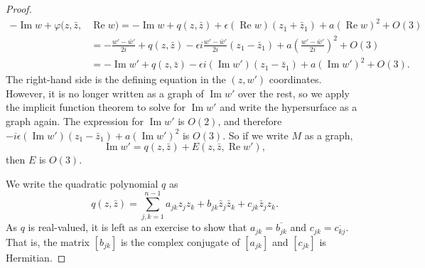 \documentclass[12pt,openany]{book}
\renewcommand{\Re}{\operatorname{Re}}
\renewcommand{\Im}{\operatorname{Im}}
\theoremstyle{plain}
\theoremstyle{remark}
\theoremstyle{definition}
\theoremstyle{exercise}
\theoremstyle{example}
\begin{document}
\begin{proof}
\begin{equation*}
\begin{split}
-\Im w + \varphi(z,\bar{z}, & \Re w)  =
-\Im w +
q(z,\bar{z}) +
\epsilon (\Re w) (z_1+\bar{z}_1)
+ a{(\Re w)}^2
+O(3)
\\
& =
-\frac{w'-\bar{w}'}{2i} 
+
q(z,\bar{z}) 
- \epsilon i
\frac{w' -\bar{w}'}{2i}
( z_1 -\bar{z}_1)
+ a {\left(\frac{w'-\bar{w}'}{2i}\right)}^2
+O(3)
\\
& =
-\Im w'
+ q(z,\bar{z})
-
\epsilon i
(\Im w')
( z_1 -\bar{z}_1)
+
a {(\Im w')}^2
+O(3) .
\end{split}
\end{equation*}
The right-hand side is the defining equation in the $(z,w')$ coordinates.
However, it is no longer written as a graph of $\Im w'$ over the
rest, so we apply the implicit
function theorem to solve for $\Im w'$
and write the hypersurface as a graph again.
The expression for $\Im w'$
is $O(2)$, and therefore $-i\epsilon (\Im w')(z_1-\bar{z}_1)+a{(\Im w')}^2$
is $O(3)$.
So if we write $M$ as a graph,
\begin{equation*}
\Im w' = q(z,\bar{z}) + E(z,\bar{z},\Re w'),
\end{equation*}
then $E$ is $O(3)$.

We write the quadratic polynomial $q$ as
\begin{equation} \label{eq:generalquadraticq}
q(z,\bar{z}) =
\sum_{j,k=1}^{n-1}
a_{jk} z_jz_k
+
b_{jk} \bar{z}_j\bar{z}_k
+
c_{jk} \bar{z}_jz_k .
\end{equation}
As $q$ is real-valued, it is left as an exercise to show that $a_{jk} =
\overline{b_{jk}}$ and $c_{jk} = \overline{c_{kj}}$.  That is, the
matrix $[b_{jk}]$ is the complex conjugate of $[a_{jk}]$ and
$[c_{jk}]$ is Hermitian.


\end{proof}
\end{document}
